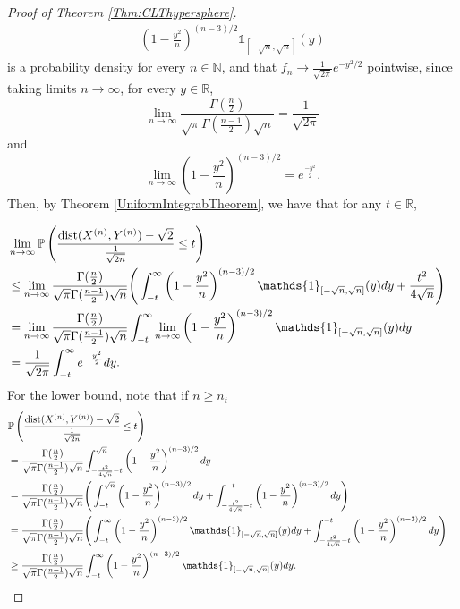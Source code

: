\documentclass[10pt]{amsart}
\def\R{\mathbb{R}}
\def\N{\mathbb{N}}
\def\dist{\text{dist}}
\numberwithin{equation}{section}
\begin{document}
\begin{proof}[Proof of Theorem \ref{Thm:CLThypersphere}]
\begin{align*}
\left(1- \frac{y^2}{n}\right)^{(n-3)/2} \mathds{1}_{[-\sqrt{n} , \sqrt{n}]} (y)
\end{align*}
is a probability density for every $n \in \N$, and that $f_n \to \frac{1}{\sqrt{2 \pi}} e^{-y^2 / 2}$ pointwise, since taking limits $n \to \infty$, for every $y \in \mathbb{R}$,
$$ \displaystyle{\lim _{n \to \infty} \frac{\Gamma ( \frac{n}{2} ) }{ \sqrt{\pi} \Gamma ( \frac{n-1}{2} ) \sqrt{n}} = \frac{1}{\sqrt{2\pi}}}$$
and
$$ \displaystyle{\lim _{n \to \infty} \left(1- \frac{y^2}{n}\right)^{(n-3)/2} = e^{\frac{-y^2}{2}}} .$$
Then, by Theorem \ref{UniformIntegrabTheorem}, we have that for any $t \in \R$,

\begin{align*}
& \lim _{n \to \infty} \mathbb{P} \left(\frac{\dist(X^{(n)},Y^{(n)}) - \sqrt{2}}{\frac{1}{\sqrt{2n}}} \leq t\right) \cr
& \leq \lim _{n \to \infty} \frac{\Gamma ( \frac{n}{2} ) }{ \sqrt{\pi} \Gamma ( \frac{n-1}{2} ) \sqrt{n}}  \Bigg(  \int_{-t}^{\infty} \left(1- \frac{y^2}{n}\right)^{(n-3)/2} \mathds{1}_{[-\sqrt{n} , \sqrt{n}]} (y) dy + \frac{t^2}{4\sqrt{n}} \Bigg) \cr
& = \lim _{n \to \infty} \frac{\Gamma ( \frac{n}{2} ) }{ \sqrt{\pi} \Gamma ( \frac{n-1}{2} ) \sqrt{n}}   \int_{-t}^{\infty} \lim _{n \to \infty} \left(1- \frac{y^2}{n}\right)^{(n-3)/2} \mathds{1}_{[-\sqrt{n} , \sqrt{n}]} (y) dy   \cr
& = \frac{1}{\sqrt{2 \pi}} 
 \int_{ - t }^{\infty} e^{-\frac{y^2}{2}} dy.
\end{align*}
For the lower bound, note that if $n \geq  n_t$ 
\begin{align*}
& \mathbb{P} \left(\frac{\dist(X^{(n)},Y^{(n)}) - \sqrt{2}}{\frac{1}{\sqrt{2n}}} \leq t\right) \cr
& =  \frac{\Gamma ( \frac{n}{2} ) }{ \sqrt{\pi} \Gamma ( \frac{n-1}{2} ) \sqrt{n}} 
 \int_{ -\frac{t^2}{4\sqrt{n}} - t}^{\sqrt{n}} \left(1- \frac{y^2}{n}\right)^{(n-3)/2} dy   \cr
& = \frac{\Gamma ( \frac{n}{2} ) }{ \sqrt{\pi} \Gamma ( \frac{n-1}{2} ) \sqrt{n}}  \Bigg(  \int_{ -t}^{\sqrt{n}} \left(1- \frac{y^2}{n}\right)^{(n-3)/2} dy   + \int_{-\frac{t^2}{4\sqrt{n}} - t }^{-t} \left(1- \frac{y^2}{n}\right)^{(n-3)/2} dy \Bigg) \cr
& = \frac{\Gamma ( \frac{n}{2} ) }{ \sqrt{\pi} \Gamma ( \frac{n-1}{2} ) \sqrt{n}}  \Bigg(  \int_{-t}^{\infty} \left(1- \frac{y^2}{n}\right)^{(n-3)/2} \mathds{1}_{[-\sqrt{n} , \sqrt{n}]} (y) dy + \int_{-\frac{t^2}{4\sqrt{n}} - t }^{-t} \left(1- \frac{y^2}{n}\right)^{(n-3)/2} dy \Bigg) \cr
& \geq  \frac{\Gamma ( \frac{n}{2} ) }{ \sqrt{\pi} \Gamma ( \frac{n-1}{2} ) \sqrt{n}}   \int_{-t}^{\infty} \left(1- \frac{y^2}{n}\right)^{(n-3)/2} \mathds{1}_{[-\sqrt{n} , \sqrt{n}]} (y) dy .
\end{align*}

\end{proof}
\end{document}
